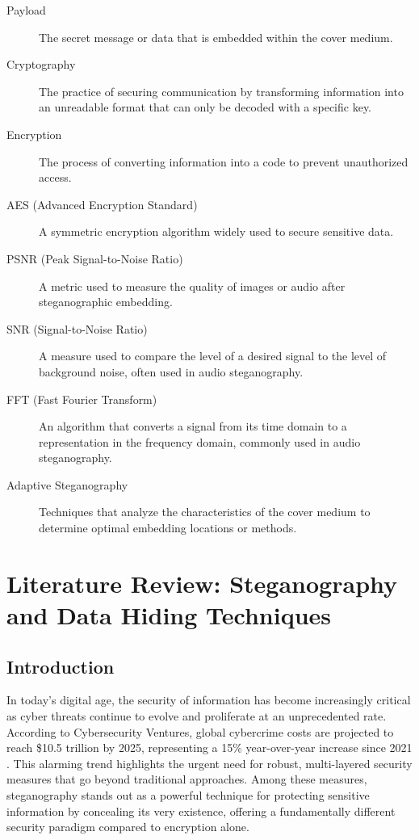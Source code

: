 \documentclass[12pt, a4paper, oneside]{book}
\begin{document}
\begin{description}
    \item[Payload] The secret message or data that is embedded within the cover medium.

    \item[Cryptography] The practice of securing communication by transforming information into an unreadable format that can only be decoded with a specific key.

    \item[Encryption] The process of converting information into a code to prevent unauthorized access.

    \item[AES (Advanced Encryption Standard)] A symmetric encryption algorithm widely used to secure sensitive data.

    \item[PSNR (Peak Signal-to-Noise Ratio)] A metric used to measure the quality of images or audio after steganographic embedding.

    \item[SNR (Signal-to-Noise Ratio)] A measure used to compare the level of a desired signal to the level of background noise, often used in audio steganography.

    \item[FFT (Fast Fourier Transform)] An algorithm that converts a signal from its time domain to a representation in the frequency domain, commonly used in audio steganography.

    \item[Adaptive Steganography] Techniques that analyze the characteristics of the cover medium to determine optimal embedding locations or methods.
\end{description}

\chapter{Literature Review: Steganography and Data Hiding Techniques}

\section{Introduction}
In today's digital age, the security of information has become increasingly critical as cyber threats continue to evolve and proliferate at an unprecedented rate. According to Cybersecurity Ventures, global cybercrime costs are projected to reach \$10.5 trillion by 2025, representing a 15\% year-over-year increase since 2021 \cite{CybersecurityVenture2024}. This alarming trend highlights the urgent need for robust, multi-layered security measures that go beyond traditional approaches. Among these measures, steganography stands out as a powerful technique for protecting sensitive information by concealing its very existence, offering a fundamentally different security paradigm compared to encryption alone.
\end{document}
